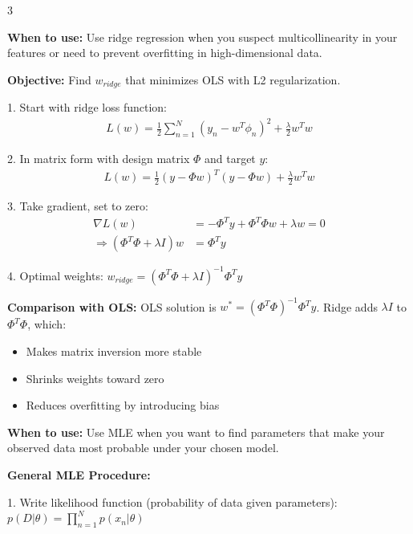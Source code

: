 \documentclass[10pt,landscape]{article}
\begin{document}
\begin{multicols}{3}
\begin{tcolorbox}[breakable, title=1.1 Ridge Regression Derivation, colback=regression]
\textbf{When to use:} Use ridge regression when you suspect multicollinearity in your features or need to prevent overfitting in high-dimensional data.

\textbf{Objective:} Find $w_{ridge}$ that minimizes OLS with L2 regularization.

1. Start with ridge loss function:
\begin{align}
L(w) = \frac{1}{2}\sum_{n=1}^{N}(y_n - w^T\phi_n)^2 + \frac{\lambda}{2}w^Tw
\end{align}

2. In matrix form with design matrix $\Phi$ and target $y$:
\begin{align}
L(w) = \frac{1}{2}(y - \Phi w)^T(y - \Phi w) + \frac{\lambda}{2}w^Tw
\end{align}

3. Take gradient, set to zero:
\begin{align}
\nabla L(w) &= -\Phi^Ty + \Phi^T\Phi w + \lambda w = 0\\
\Rightarrow (\Phi^T\Phi + \lambda I)w &= \Phi^Ty
\end{align}

4. Optimal weights: $w_{ridge} = (\Phi^T\Phi + \lambda I)^{-1}\Phi^Ty$

\textbf{Comparison with OLS:} 
OLS solution is $w^* = (\Phi^T\Phi)^{-1}\Phi^Ty$. 
Ridge adds $\lambda I$ to $\Phi^T\Phi$, which:
\begin{itemize}[leftmargin=*,noitemsep,topsep=0pt]
    \item Makes matrix inversion more stable
    \item Shrinks weights toward zero
    \item Reduces overfitting by introducing bias
\end{itemize}
\end{tcolorbox}

\begin{tcolorbox}[breakable, title=1.2 Maximum Likelihood Estimation, colback=regression]
\textbf{When to use:} Use MLE when you want to find parameters that make your observed data most probable under your chosen model.

\textbf{General MLE Procedure:}

1. Write likelihood function (probability of data given parameters):
$p(D|\theta) = \prod_{n=1}^{N} p(x_n|\theta)$


\end{tcolorbox}
\end{multicols}
\end{document}

